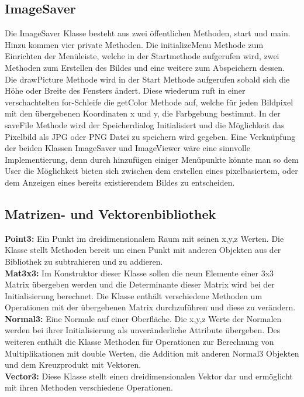 \documentclass[14pt]{extarticle}
\begin{document}
\subsection{ImageSaver}
Die ImageSaver Klasse besteht aus zwei öffentlichen Methoden, start und main. 
Hinzu kommen vier private Methoden. Die initializeMenu Methode zum Einrichten der Menüleiste, welche in der Startmethode aufgerufen wird, zwei Methoden zum Erstellen des Bildes und eine weitere zum Abspeichern dessen. 
\newline
Die drawPicture Methode wird in der Start Methode aufgerufen sobald sich die Höhe oder Breite des Fensters ändert. Diese wiederum ruft in einer verschachtelten for-Schleife die getColor Methode auf, welche für jeden Bildpixel mit den übergebenen Koordinaten x und y, die Farbgebung bestimmt. 
\newline
In der saveFile Methode wird der Speicherdialog Initialisiert und die Möglichkeit das Pixelbild als JPG oder PNG Datei zu speichern wird gegeben. 
\newline
Eine Verknüpfung der beiden Klassen ImageSaver und ImageViewer wäre eine sinnvolle Implementierung, denn durch hinzufügen einiger Menüpunkte könnte man so dem User die Möglichkeit bieten sich zwischen dem erstellen eines pixelbasiertem, oder dem Anzeigen eines bereits existierendem Bildes zu entscheiden. 

\subsection{Matrizen- und Vektorenbibliothek}
\textbf{Point3:} Ein Punkt im dreidimensionalem Raum mit seinen x,y,z Werten. Die Klasse stellt Methoden bereit um einen Punkt mit anderen Objekten aus der Bibliothek zu subtrahieren und zu addieren.
\\\textbf{Mat3x3:} Im Konstruktor dieser Klasse sollen die neun Elemente einer 3x3 Matrix übergeben werden und die Determinante dieser Matrix wird bei der Initialisierung berechnet. Die Klasse enthält verschiedene Methoden um Operationen mit der übergebenen Matrix durchzuführen und diese zu verändern. 
\\\textbf{Normal3:} Eine Normale auf einer Oberfläche. Die x,y,z Werte der Normalen werden bei ihrer Initialisierung als unveränderliche Attribute übergeben. Des weiteren enthält die Klasse Methoden für Operationen zur Berechnung von Multiplikationen mit double Werten, die Addition mit anderen Normal3 Objekten und dem Kreuzprodukt mit Vektoren.
\\\textbf{Vector3:} Diese Klasse stellt einen dreidimensionalen Vektor dar und ermöglicht mit ihren Methoden verschiedene Operationen.
\end{document}
